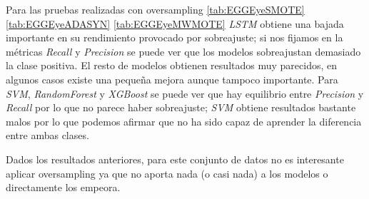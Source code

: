 Para las pruebas realizadas con oversampling \ref{tab:EGGEyeSMOTE} \ref{tab:EGGEyeADASYN} \ref{tab:EGGEyeMWMOTE} \textit{LSTM} obtiene una bajada importante en su rendimiento provocado por sobreajuste; si nos fijamos en la métricas \textit{Recall} y \textit{Precision} se puede ver que los modelos sobreajustan demasiado la clase positiva. El resto de modelos obtienen resultados muy parecidos, en algunos casos existe una pequeña mejora aunque tampoco importante. Para \textit{SVM}, \textit{RandomForest} y \textit{XGBoost} se puede ver que hay equilibrio entre \textit{Precision} y \textit{Recall} por lo que no parece haber sobreajuste; \textit{SVM} obtiene resultados bastante malos por lo que podemos afirmar que no ha sido capaz de aprender la diferencia entre ambas clases.\newline

Dados los resultados anteriores, para este conjunto de datos no es interesante aplicar oversampling ya que no aporta nada (o casi nada) a los modelos o directamente los empeora.


